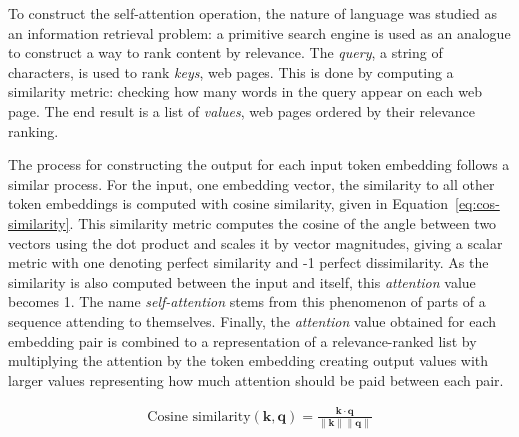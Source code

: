 \documentclass[english,twoside,openright]{UH_DS_MSc}
\begin{document}
To construct the self-attention operation, the nature of language was studied 
as an information retrieval problem: a primitive search engine is used as an analogue to construct a way to rank content by relevance.
The \textit{query}, a string of characters, is used to rank \textit{keys}, web pages. This is done by computing a similarity metric: checking how many words in the query appear on each web page. The
end result is a list of \textit{values}, web pages ordered by their relevance ranking.

The process for constructing the output for each input token embedding follows a similar process.
For the input, one embedding vector, the similarity to all other token embeddings is computed with cosine similarity, given in Equation~\ref{eq:cos-similarity}. This similarity metric computes the cosine of the angle between two vectors using the dot product and scales it by vector magnitudes,
 giving a scalar metric with one denoting perfect similarity and -1 perfect dissimilarity. As the similarity is also computed between the input and itself, this \textit{attention} value becomes 1.
The name \textit{self-attention} stems from this phenomenon of parts of a sequence attending to themselves. Finally, the \textit{attention} value obtained for each embedding pair is combined to a representation of a relevance-ranked list by multiplying the attention by the token embedding creating output values with larger values representing how much attention should be paid between each pair.

\begin{align}
    \text{Cosine similarity}(\mathbf{k}, \mathbf{q}) = \frac{\mathbf{k} \cdot \mathbf{q}}{\|\mathbf{k}\| \|\mathbf{q}\|}
    \label{eq:cos-similarity}
\end{align}
\end{document}
